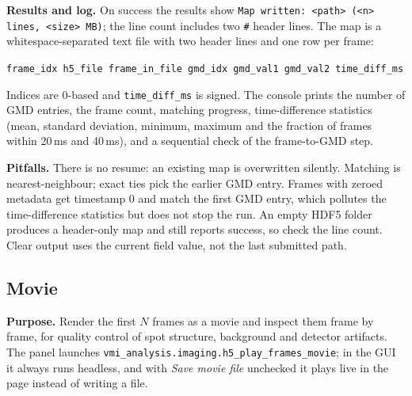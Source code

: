\documentclass[11pt,a4paper]{article}
\newcommand{\code}[1]{\texttt{#1}}
\begin{document}
\textbf{Results and log.} On success the results show
\code{Map written: <path> (<n> lines, <size> MB)}; the line count includes
two \code{\#} header lines. The map is a whitespace-separated text file
with two header lines and one row per frame:
\begin{center}
\footnotesize
\code{frame\_\allowbreak{}idx  h5\_\allowbreak{}file  frame\_\allowbreak{}in\_\allowbreak{}file  gmd\_\allowbreak{}idx  gmd\_\allowbreak{}val1  gmd\_\allowbreak{}val2  time\_\allowbreak{}diff\_\allowbreak{}ms}
\end{center}
Indices are 0-based and \code{time\_\allowbreak{}diff\_\allowbreak{}ms} is signed. The console
prints the number of GMD entries, the frame count, matching progress,
time-difference statistics (mean, standard deviation, minimum, maximum and
the fraction of frames within 20\,ms and 40\,ms), and a sequential check of
the frame-to-GMD step.

\textbf{Pitfalls.} There is no resume: an existing map is overwritten
silently. Matching is nearest-neighbour; exact ties pick the earlier GMD
entry. Frames with zeroed metadata get timestamp 0 and match the first GMD
entry, which pollutes the time-difference statistics but does not stop the
run. An empty HDF5 folder produces a header-only map and still reports
success, so check the line count. Clear output uses the current field value,
not the last submitted path.

\subsection{Movie}
\label{sec:movie}

\textbf{Purpose.} Render the first $N$ frames as a movie and inspect them
frame by frame, for quality control of spot structure, background and
detector artifacts. The panel launches
\code{vmi\_\allowbreak{}analysis.imaging.h5\_\allowbreak{}play\_\allowbreak{}frames\_\allowbreak{}movie}; in the GUI it always
runs headless, and with \emph{Save movie file} unchecked it plays live in the
page instead of writing a file.
\end{document}
